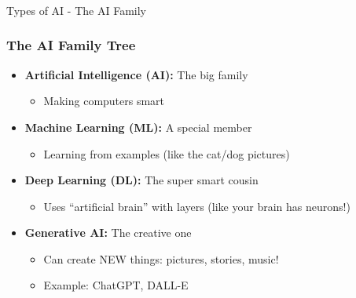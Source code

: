 \begin{frame}[fragile]\frametitle{}
\begin{center}
{\Large Types of AI - The AI Family}
\end{center}
\end{frame}

\begin{frame}[fragile]\frametitle{The AI Family Tree}
\begin{itemize}
\item {\bf Artificial Intelligence (AI):} The big family
\begin{itemize}
\item Making computers smart
\end{itemize}
\item {\bf Machine Learning (ML):} A special member
\begin{itemize}
\item Learning from examples (like the cat/dog pictures)
\end{itemize}
\item {\bf Deep Learning (DL):} The super smart cousin
\begin{itemize}
\item Uses ``artificial brain'' with layers (like your brain has neurons!)
\end{itemize}
\item {\bf Generative AI:} The creative one
\begin{itemize}
\item Can create NEW things: pictures, stories, music!
\item Example: ChatGPT, DALL-E
\end{itemize}
\end{itemize}
\end{frame}

